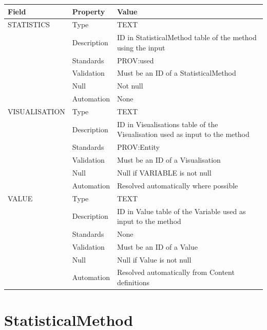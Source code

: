 \begin{longtable}[]{@{}
  >{\raggedright\arraybackslash}p{}
  >{\raggedright\arraybackslash}p{}
  >{\raggedright\arraybackslash}p{}@{}}
\toprule\noalign{}
\begin{minipage}[b]{\linewidth}\raggedright
Field
\end{minipage} & \begin{minipage}[b]{\linewidth}\raggedright
Property
\end{minipage} & \begin{minipage}[b]{\linewidth}\raggedright
Value
\end{minipage} \\
\midrule\noalign{}
\endhead
\bottomrule\noalign{}
\endlastfoot
STATISTICS & Type & TEXT \\
& Description & ID in StatisticalMethod table of the method using the
input \\
& Standards & PROV:used \\
& Validation & Must be an ID of a StatisticalMethod \\
& Null & Not null \\
& Automation & None \\
VISUALISATION & Type & TEXT \\
& Description & ID in Visualisations table of the Visualisation used as
input to the method \\
& Standards & PROV:Entity \\
& Validation & Must be an ID of a Visualisation \\
& Null & Null if VARIABLE is not null \\
& Automation & Resolved automatically where possible \\
VALUE & Type & TEXT \\
& Description & ID in Value table of the Variable used as input to the
method \\
& Standards & None \\
& Validation & Must be an ID of a Value \\
& Null & Null if Value is not null \\
& Automation & Resolved automatically from Content definitions \\
\end{longtable}

\section{StatisticalMethod}\label{statisticalmethod}

